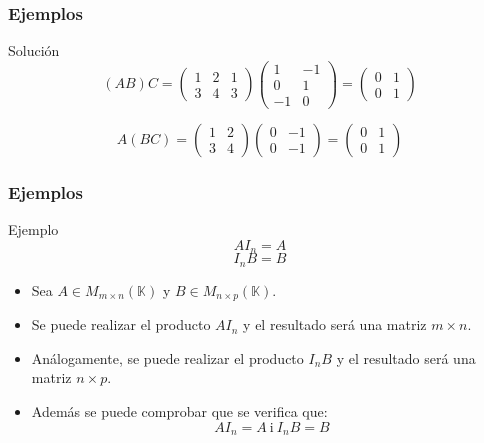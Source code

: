\documentclass[12pt]{article}
\begin{document}
 
     \begin{frame}
  \frametitle{Ejemplos}
  
   \begin{block}{Soluci\'on}
  \[ (AB)C = \left(\begin{array}{ccc}1 & 2 &1 \\3 & 4 &3\end{array}\right) 
  	\left(\begin{array}{cc}1 & -1 \\0 & 1 \\-1 & 0\end{array}\right) =
	\left(\begin{array}{cc}0 & 1 \\0 & 1 \end{array}\right)
  \]

  \[ A(BC) =\left(\begin{array}{cc}1 & 2 \\3 & 4\end{array}\right) 
  	\left(\begin{array}{cc}0 & -1 \\0 & -1 \end{array}\right) =
	\left(\begin{array}{cc}0 & 1 \\0 & 1 \end{array}\right)
  \]
  \end{block}


 \end{frame} 
 
 
 
   \begin{frame}
  \frametitle{Ejemplos}
  
   \begin{block}{Ejemplo}
   \[AI_n = A \]
   \[ I_nB = B \]
  \end{block}
   \begin{itemize}

 \item Sea $A\in M_{m\times n}(\mathbb{K})$ y $B\in M_{n\times p}(\mathbb{K})$.
 
 \item Se puede realizar el producto $AI_n$ y el resultado ser\'a una matriz $m\times n$. 
 
\item  An\'alogamente, se puede realizar el producto $I_nB$ y el resultado ser\'a una matriz $n\times p$.
 
 \item Adem\'as se puede comprobar que se verifica que:
   \[AI_n = A\ \mathrm{i}\ I_nB = B \]
\end{itemize}
 \end{frame} 
 
\end{document}

